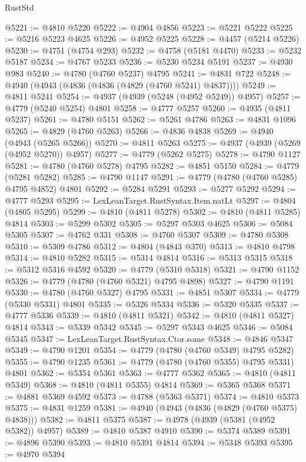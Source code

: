 \begin{lexlean}{RustStd}
\begin{coremodule}
@5221 := @4810 @5220
@5222 := @4904 @4856
@5223 := @5221 @5222
@5225 := @5216 @5223 @4625
@5226 := @4952 @5225
@5228 := @4457 (@5214 @5226)
@5230 := @4751 (@4754 @293)
@5232 := @4758 (@5181 @4470)
@5233 := @5232 @5187
@5234 := @4767 @5233
@5236 := @5230 @5234 @5191
@5237 := @4930 @983
@5240 := @4780 (@4760 @5237) @4795
@5241 := @4831 @722
@5248 := @4940 (@4943 (@4836 (@4836 (@4829 (@4760 @5241) @4837))))
@5249 := @4811 @5241
@5254 := @4937 (@4939 (@5248 (@4952 @5249)) @4957)
@5257 := @4779 (@5240 @5254) @4801
@5258 := @4777 @5257
@5260 := @4935 (@4811 @5237)
@5261 := @4780 @5151
@5262 := @5261 @4786
@5263 := @4831 @1096
@5265 := @4829 (@4760 @5263)
@5266 := @4836 @4838
@5269 := @4940 (@4943 (@5265 @5266))
@5270 := @4811 @5263
@5275 := @4937 (@4939 (@5269 (@4952 @5270)) @4957)
@5277 := @4779 (@5262 @5275)
@5278 := @4790 @1127
@5281 := @4780 (@4760 @5278) @4795
@5282 := @4851 @5150
@5284 := @4779 (@5281 @5282)
@5285 := @4790 @1147
@5291 := @4779 (@4780 (@4760 @5285) @4795 @4852) @4801
@5292 := @5284 @5291
@5293 := @5277 @5292
@5294 := @4777 @5293
@5295 := LexLeanTarget.RustSyntax.Item.natLt
@5297 := @4804 (@4805 @5295)
@5299 := @4810 (@4811 @5278)
@5302 := @4810 (@4811 @5285) @4814
@5303 := @5299 @5302
@5305 := @5297 @5303 @4625
@5306 := @5084 @5305
@5307 := @4762 @331
@5308 := @4760 @5307
@5309 := @4780 @5308
@5310 := @5309 @4786
@5312 := @4804 (@4843 @370)
@5313 := @4810 @4798
@5314 := @4810 @5282
@5315 := @5314 @4814
@5316 := @5313 @5315
@5318 := @5312 @5316 @4592
@5320 := @4779 (@5310 @5318)
@5321 := @4790 @1152
@5326 := @4779 (@4780 (@4760 @5321) @4795 @4898)
@5327 := @4790 @1191
@5330 := @4780 (@4760 @5327) @4795
@5331 := @4851 @5307
@5334 := @4779 (@5330 @5331) @4801
@5335 := @5326 @5334
@5336 := @5320 @5335
@5337 := @4777 @5336
@5339 := @4810 (@4811 @5321)
@5342 := @4810 (@4811 @5327) @4814
@5343 := @5339 @5342
@5345 := @5297 @5343 @4625
@5346 := @5084 @5345
@5347 := LexLeanTarget.RustSyntax.Ctor.some
@5348 := @4846 @5347
@5349 := @4790 @1201
@5354 := @4779 (@4780 (@4760 @5349) @4795 @5282)
@5355 := @4790 @1235
@5361 := @4779 (@4780 (@4760 @5355) @4795 @5331) @4801
@5362 := @5354 @5361
@5363 := @4777 @5362
@5365 := @4810 (@4811 @5349)
@5368 := @4810 (@4811 @5355) @4814
@5369 := @5365 @5368
@5371 := @4881 @5369 @4592
@5373 := @4788 (@5363 @5371)
@5374 := @4810 @5373
@5375 := @4831 @1259
@5381 := @4940 (@4943 (@4836 (@4829 (@4760 @5375) @4838)))
@5382 := @4811 @5375
@5387 := @4978 (@4939 (@5381 (@4952 @5382)) @4957)
@5389 := @4810 @5387 @4910
@5390 := @5374 @5389
@5391 := @4896 @5390
@5393 := @4810 @5391 @4814
@5394 := @5348 @5393
@5395 := @4970 @5394

\end{coremodule}
\end{lexlean}
